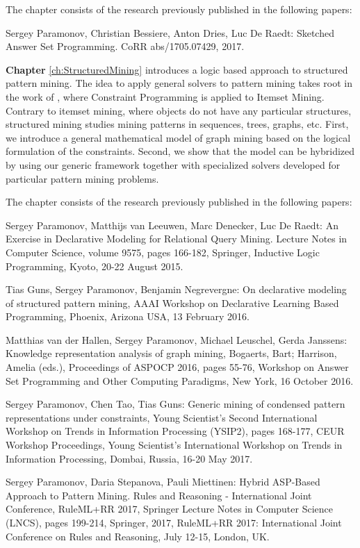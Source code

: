 The chapter consists of the research previously published in the following papers:
\begin{addmargin}[2em]{2em}
  Sergey Paramonov, Christian Bessiere, Anton Dries, Luc De Raedt:
  Sketched Answer Set Programming. CoRR abs/1705.07429, 2017.
\end{addmargin}


\textbf{Chapter} \ref{ch:StructuredMining} introduces a logic
based approach to structured pattern mining. The idea to apply general
solvers to pattern mining takes root in the work of
\textcite{declrativeapproach}, where Constraint Programming is applied to
Itemset Mining. Contrary to itemset mining, where objects do not have
any particular structures, structured mining studies mining patterns
in sequences, trees, graphs, etc. First, we introduce a general
mathematical model of graph mining based on the logical formulation of
the constraints. Second, we show that the model can be hybridized by
using our generic framework together with specialized solvers
developed for particular pattern mining problems.

The chapter consists of the research previously published in the following papers:
\begin{addmargin}[2em]{2em}
Sergey Paramonov, Matthijs van Leeuwen, Marc Denecker, Luc De Raedt:
An Exercise in Declarative Modeling for Relational Query Mining.
Lecture Notes in Computer Science, volume 9575, pages 166-182,
    Springer, Inductive Logic Programming, Kyoto, 20-22 August 2015.

Tias Guns, Sergey Paramonov, Benjamin Negrevergne: On declarative
    modeling of structured pattern mining, AAAI Workshop on
    Declarative Learning Based Programming, Phoenix, Arizona USA, 13
    February 2016.

Matthias van der Hallen, Sergey Paramonov, Michael Leuschel, Gerda
    Janssens: Knowledge representation analysis of graph mining,
    Bogaerts, Bart; Harrison, Amelia (eds.), Proceedings of ASPOCP
    2016, pages 55-76, Workshop on Answer Set Programming and Other
    Computing Paradigms, New York, 16 October 2016.

Sergey Paramonov, Chen Tao, Tias Guns: Generic mining of condensed
    pattern representations under constraints, Young Scientist's
    Second International Workshop on Trends in Information Processing
    (YSIP2), pages 168-177, CEUR Workshop Proceedings, Young
    Scientist's International Workshop on Trends in Information
    Processing, Dombai, Russia, 16-20 May 2017.

Sergey Paramonov, Daria Stepanova, Pauli Miettinen:
Hybrid ASP-Based Approach to Pattern Mining.  
Rules and Reasoning - International Joint Conference, RuleML+RR 2017,
    Springer Lecture Notes in Computer Science (LNCS), pages 199-214,
    Springer, 2017, RuleML+RR 2017: International Joint Conference on
    Rules and Reasoning, July 12-15, London, UK.
\end{addmargin}

